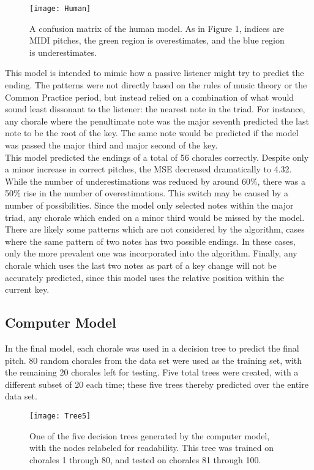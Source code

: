 \documentclass[12pt]{article}
\begin{document}
\begin{figure}[h]
  \texttt{[image: Human]}
  \centering
  \caption{A confusion matrix of the human model. As in Figure 1, indices are MIDI pitches, the green region is overestimates, and the blue region is underestimates.}
\end{figure}


This model is intended to mimic how a passive listener might try to predict the ending. The patterns were not directly based on the rules of music theory or the Common Practice period, but instead relied on a combination of what would sound least dissonant to the listener: the nearest note in the triad. For instance, any chorale where the penultimate note was the major seventh predicted the last note to be the root of the key. The same note would be predicted if the model was passed the major third and major second of the key.\\

This model predicted the endings of a total of 56 chorales correctly. Despite only a minor increase in correct pitches, the MSE decreased dramatically to 4.32. While the number of underestimations was reduced by around 60\%, there was a 50\% rise in the number of overestimations. This switch may be caused by a number of possibilities. Since the model only selected notes within the major triad, any chorale which ended on a minor third would be missed by the model. There are likely some patterns which are not considered by the algorithm, cases where the same pattern of two notes has two possible endings. In these cases, only the more prevalent one was incorporated into the algorithm. Finally, any chorale which uses the last two notes as part of a key change will not be accurately predicted, since this model uses the relative position within the current key.

\subsection{Computer Model}
In the final model, each chorale was used in a decision tree to predict the final pitch. 80 random chorales from the data set were used as the training set, with the remaining 20 chorales left for testing. Five total trees were created, with a different subset of 20 each time; these five trees thereby predicted over the entire data set.\\

\begin{figure}[h]
  \texttt{[image: Tree5]}
  \centering
  \caption{One of the five decision trees generated by the computer model, with the nodes relabeled for readability. This tree was trained on chorales 1 through 80, and tested on chorales 81 through 100.}
\end{figure}
\end{document}
